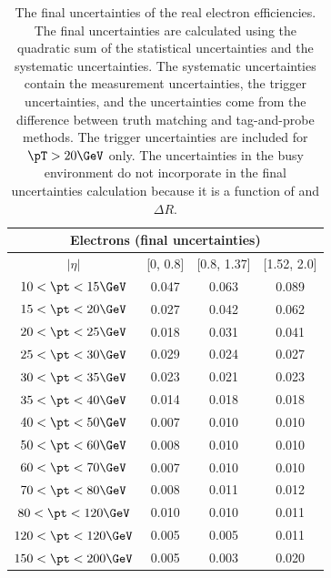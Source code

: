 \begin{table}[htbp]
\begin{center}
\begin{tabular}{cccc}
\hline
\hline
\multicolumn{4}{c}{Electrons (final uncertainties)}\\
\hline
$|\eta|$ & [0, 0.8] & [0.8, 1.37] & [1.52, 2.0]\\
\hline
$10<\pt<15 \GeV$ & 0.047 & 0.063 & 0.089\\
$15<\pt<20 \GeV$ & 0.027 & 0.042 & 0.062\\
$20<\pt<25 \GeV$ & 0.018 & 0.031 & 0.041\\
$25<\pt<30 \GeV$ & 0.029 & 0.024 & 0.027\\
$30<\pt<35 \GeV$ & 0.023 & 0.021 & 0.023\\
$35<\pt<40 \GeV$ & 0.014 & 0.018 & 0.018\\
$40<\pt<50 \GeV$ & 0.007 & 0.010 & 0.010\\
$50<\pt<60 \GeV$ & 0.008 & 0.010 & 0.010\\
$60<\pt<70 \GeV$ & 0.007 & 0.010 & 0.010\\
$70<\pt<80 \GeV$ & 0.008 & 0.011 & 0.012\\
$80<\pt<120 \GeV$ & 0.010 & 0.010 & 0.011\\
$120<\pt<120 \GeV$ & 0.005 & 0.005 & 0.011\\
$150<\pt<200 \GeV$ & 0.005 & 0.003 & 0.020\\
\hline
\hline
\end{tabular}
\caption{The final uncertainties of the real electron efficiencies.
The final uncertainties are calculated using the quadratic sum of the statistical uncertainties and the systematic uncertainties.
The systematic uncertainties contain the measurement uncertainties, the trigger uncertainties, and the uncertainties come from the difference between truth matching and tag-and-probe methods.
The trigger uncertainties are included for $\pT>20 \GeV$ only.
The uncertainties in the busy environment do not incorporate in the final uncertainties calculation because it is a function of \pT and $\Delta R$.
}
\label{tab:RLE_final_uncertainties_elec}
\end{center}
\end{table}

